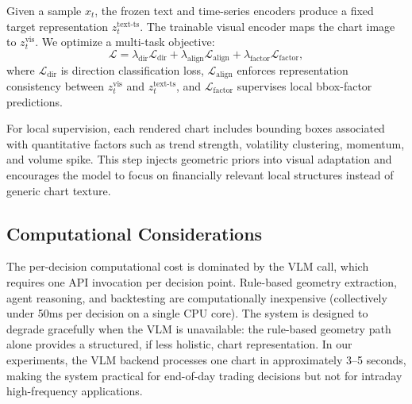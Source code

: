 Given a sample $x_t$, the frozen text and time-series encoders produce a fixed target representation $z_t^{\text{text-ts}}$. The trainable visual encoder maps the chart image to $z_t^{\text{vis}}$. We optimize a multi-task objective:
\begin{equation}
\mathcal{L} = \lambda_{\text{dir}}\mathcal{L}_{\text{dir}} + \lambda_{\text{align}}\mathcal{L}_{\text{align}} + \lambda_{\text{factor}}\mathcal{L}_{\text{factor}},
\end{equation}
where $\mathcal{L}_{\text{dir}}$ is direction classification loss, $\mathcal{L}_{\text{align}}$ enforces representation consistency between $z_t^{\text{vis}}$ and $z_t^{\text{text-ts}}$, and $\mathcal{L}_{\text{factor}}$ supervises local bbox-factor predictions.

For local supervision, each rendered chart includes bounding boxes associated with quantitative factors such as trend strength, volatility clustering, momentum, and volume spike. This step injects geometric priors into visual adaptation and encourages the model to focus on financially relevant local structures instead of generic chart texture.

\subsection{Computational Considerations}
\label{sec:compute}

The per-decision computational cost is dominated by the VLM call, which requires one API invocation per decision point. Rule-based geometry extraction, agent reasoning, and backtesting are computationally inexpensive (collectively under 50ms per decision on a single CPU core). The system is designed to degrade gracefully when the VLM is unavailable: the rule-based geometry path alone provides a structured, if less holistic, chart representation. In our experiments, the VLM backend processes one chart in approximately 3--5 seconds, making the system practical for end-of-day trading decisions but not for intraday high-frequency applications.
